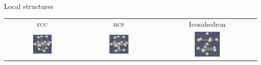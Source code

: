 \begin{frame}{Local structures}
	\begin{center}\begin{tabular}{ccc}
	\textsc{fcc} & \textsc{hcp} & Icosahedron \\ 
	\includegraphics[width=0.27\textwidth]{fcc_13} & \includegraphics[width=0.27\textwidth]{hcp_13} & \includegraphics[width=0.27\textwidth]{ico_13}
	\end{tabular}
\end{center}
\end{frame}
